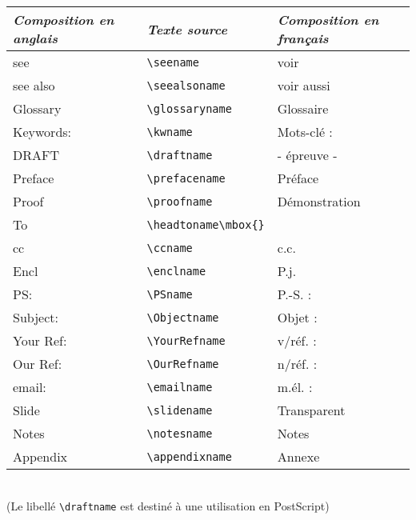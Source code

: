 \documentclass[a4paper,12pt,openright]{article}
\begin{document}
\bigskip
\begin{tabular}{|l|l|l|}\hline
\rule{0pt}{1.1em}\textit{Composition en anglais}&\textit{Texte source}&\textit{Composition en français}\\\hline
\rule{0pt}{1em}see       &\tt{\backslash}seename          &voir \index{seename@\verb'\seename'}         \\
see also  &\tt{\backslash}seealsoname      &voir aussi    \index{seealsoname @\verb'\seealsoname '}\\
Glossary  &\tt{\backslash}glossaryname     &Glossaire  \index{glossaryname@\verb'\glossaryname'}   \\
Keywords: &\tt{\backslash}kwname           &Mots-clé :    \index{kwname@\verb'\kwname'}\\
DRAFT     &\tt{\backslash}draftname        &- épreuve -   \index{draftname@\verb'\draftname'}\\
Preface   &\tt{\backslash}prefacename      &Préface    \index{prefacename@\verb'\prefacename'}   \\
Proof     &\tt{\backslash}proofname        &Démonstration\index{proofname@\verb'\proofname'} \\
To        &\tt{\backslash}headtoname\verb|\mbox{}|&              \index{headtoname@\verb'\headtoname'}\\
cc        &\tt{\backslash}ccname           &c.c.          \index{ccname@\verb'\ccname'}\\
Encl      &\tt{\backslash}enclname         &P.j.       \index{enclname@\verb'\enclname'}   \\
PS:       &\tt{\backslash}PSname           &P.-S. :    \index{PSname@\verb'\PSname'}   \\
Subject:  &\tt{\backslash}Objectname       &Objet :      \index{Objectname@\verb'\Objectname'} \\
Your Ref: &\tt{\backslash}YourRefname      &v/réf. :   \index{YourRefname@\verb'\YourRefname'}   \\
Our Ref:  &\tt{\backslash}OurRefname       &n/réf. :     \index{OurRefname@\verb'\OurRefname'} \\
email:    &\tt{\backslash}emailname        &m.él. :       \index{emailname@\verb'\emailname'}\\
Slide     &\tt{\backslash}slidename        &Transparent  \index{slidename@\verb'\slidename'} \\
Notes     &\tt{\backslash}notesname        &Notes         \index{notesname@\verb'\notesname'}\\
Appendix  &\tt{\backslash}appendixname     &Annexe       \index{appendixname@\verb'\appendixname'} \\
\hline %
\end{tabular}\\[1em]
(Le libellé {\tt{\backslash}draftname} est destiné à une utilisation en PostScript)
\end{document}
